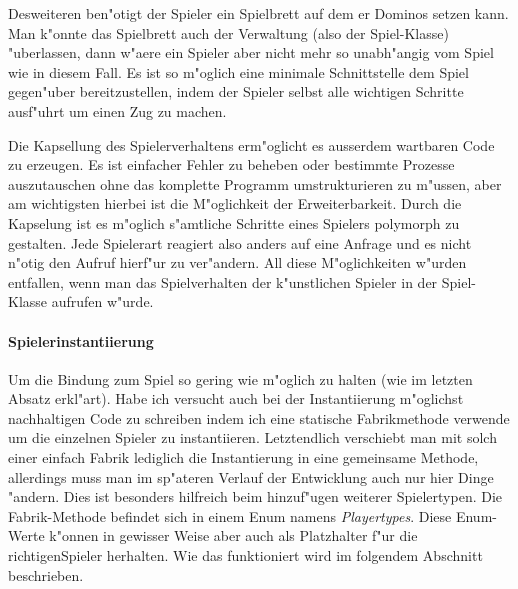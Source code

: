 Desweiteren ben"otigt der Spieler ein Spielbrett auf dem er Dominos setzen kann. Man k"onnte das Spielbrett auch der Verwaltung (also der Spiel-Klasse) "uberlassen, dann w"aere ein Spieler aber nicht mehr so unabh"angig vom Spiel wie in diesem Fall. Es ist so m"oglich eine minimale Schnittstelle dem Spiel gegen"uber bereitzustellen, indem der Spieler selbst alle wichtigen Schritte ausf"uhrt um einen Zug zu machen. 

Die Kapsellung des Spielerverhaltens erm"oglicht es ausserdem wartbaren Code zu erzeugen. Es ist einfacher Fehler zu beheben oder bestimmte Prozesse auszutauschen ohne das komplette Programm umstrukturieren zu m"ussen, aber am wichtigsten hierbei ist die M"oglichkeit der Erweiterbarkeit. Durch die Kapselung ist es m"oglich s"amtliche Schritte eines Spielers polymorph zu gestalten. Jede Spielerart reagiert also anders auf eine Anfrage und es nicht n"otig den Aufruf hierf"ur zu ver"andern. All diese M"oglichkeiten w"urden entfallen, wenn man das Spielverhalten der k"unstlichen Spieler in der Spiel-Klasse aufrufen w"urde.

\paragraph{Spielerinstantiierung}
Um die Bindung zum Spiel so gering wie m"oglich zu halten (wie im letzten Absatz erkl"art). Habe ich versucht auch bei der Instantiierung m"oglichst nachhaltigen Code zu schreiben indem ich eine statische Fabrikmethode verwende um die einzelnen Spieler zu instantiieren. Letztendlich verschiebt man mit solch einer einfach Fabrik lediglich die Instantierung in eine gemeinsame Methode, allerdings muss man im sp"ateren Verlauf der Entwicklung auch nur hier Dinge "andern. Dies ist besonders hilfreich beim hinzuf"ugen weiterer Spielertypen. Die Fabrik-Methode befindet sich in einem Enum namens \emph{Playertypes}. Diese Enum-Werte k"onnen in gewisser Weise aber auch als Platzhalter f"ur die \glqq richtigen\grqq  Spieler herhalten. Wie das funktioniert wird im folgendem Abschnitt beschrieben. 

